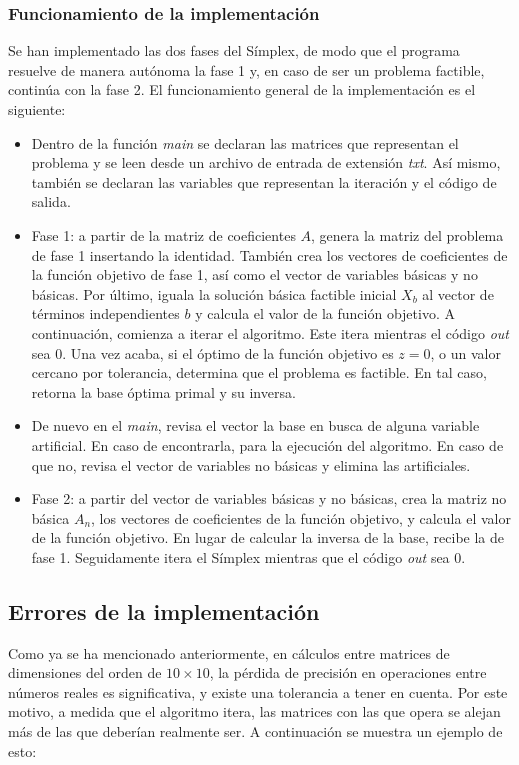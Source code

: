 \documentclass[12pt, titlepage]{article}
\begin{document}
\subsubsection{Funcionamiento de la implementación}
Se han implementado las dos fases del Símplex, de modo que el programa resuelve de manera autónoma la fase 1 y, en caso de ser un problema factible, continúa con la fase 2. El funcionamiento general de la implementación es el siguiente:
\begin{itemize}
\item	Dentro de la función \textit{main} se declaran las matrices que representan el problema y se leen desde un archivo de entrada de extensión \textit{txt}. Así mismo, también se declaran las variables que representan la iteración y el código de salida.
\item	Fase 1: a partir de la matriz de coeficientes $A$, genera la matriz del problema de fase 1 insertando la identidad. También crea los vectores de coeficientes de la función objetivo de fase 1, así como el vector de variables básicas y no básicas. Por último, iguala la solución básica factible inicial $X_b$ al vector de términos independientes $b$ y calcula el valor de la función objetivo. A continuación, comienza a iterar el algoritmo. Este itera mientras el código \textit{out} sea $0$. Una vez acaba, si el óptimo de la función objetivo es $z = 0$, o un valor cercano por tolerancia, determina que el problema es factible. En tal caso, retorna la base óptima primal y su inversa.
\item	De nuevo en el \textit{main}, revisa el vector la base en busca de alguna variable artificial. En caso de encontrarla, para la ejecución del algoritmo. En caso de que no, revisa el vector de variables no básicas y elimina las artificiales. 
\item	Fase 2: a partir del vector de variables básicas y no básicas, crea la matriz no básica $A_n$, los vectores de coeficientes de la función objetivo, y calcula el valor de la función objetivo. En lugar de calcular la inversa de la base, recibe la de fase 1. Seguidamente itera el Símplex mientras que el código \textit{out} sea $0$.
\end{itemize}


\subsection{Errores de la implementación}
Como ya se ha mencionado anteriormente, en cálculos entre matrices de dimensiones del orden de $10 \times 10$, la pérdida de precisión en operaciones entre números reales es significativa, y existe una tolerancia a tener en cuenta. Por este motivo, a medida que el algoritmo itera, las matrices con las que opera se alejan más de las que deberían realmente ser. A continuación se muestra un ejemplo de esto:\\
\end{document}

